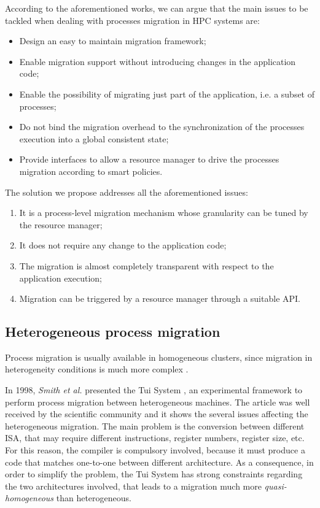 According to the aforementioned works, we can argue that the main
issues to be tackled when dealing with processes migration in HPC systems are:
\begin{itemize}
\item Design an easy to maintain migration framework;
\item Enable migration support without introducing changes in the application
code;
\item Enable the possibility of migrating just part of the application, i.e. a
subset of processes;
\item Do not bind the migration overhead to the synchronization of the
processes execution into a global consistent state;
\item Provide interfaces to allow a resource manager to drive the processes
migration according to smart policies.
\end{itemize}

The solution we propose addresses all the aforementioned issues:
\begin{enumerate}
\item It is a process-level migration mechanism whose granularity can be tuned by the resource manager;
\item It does not require any change to the application code;
\item The migration is almost completely transparent with respect to the
application execution;
\item Migration can be triggered by a resource manager through a suitable API.
\end{enumerate}

\subsection{Heterogeneous process migration}
Process migration is usually available in homogeneous 
clusters, since migration in heterogeneity conditions is much more complex
\cite{hussain2013survey}.

In 1998, \emph{Smith et al.} presented the Tui System
\cite{smith1998heterogeneous}, an experimental framework to perform process
migration between heterogeneous machines. The article was well received by
the scientific community and it shows the several issues affecting the
heterogeneous migration. The main problem is the conversion between different
ISA, that may require different instructions, register numbers, register size,
etc. For this reason, the compiler is compulsory involved, because it must
produce a code that matches one-to-one between different architecture.
As a consequence, in order to simplify the problem, the Tui System has strong
constraints regarding the two architectures involved, that leads to a
migration much more \emph{quasi-homogeneous} than heterogeneous.

